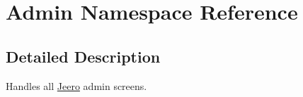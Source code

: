 \hypertarget{namespaceAdmin}{}\section{Admin Namespace Reference}
\label{namespaceAdmin}


\subsection{Detailed Description}
Handles all \hyperlink{namespaceJeero}{Jeero} admin screens. 